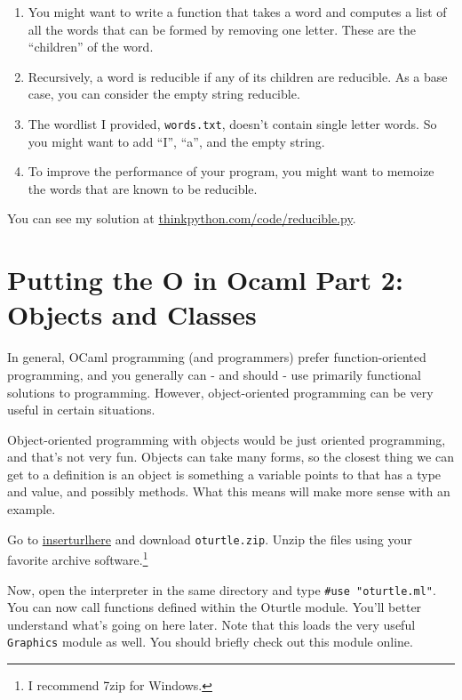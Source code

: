 \documentclass[10pt]{book}
\begin{document}
{\begin{ex}
\begin{enumerate}

\item You might want to write a function that takes a word and
  computes a list of all the words that can be formed by removing one
  letter.  These are the ``children'' of the word.


\item Recursively, a word is reducible if any of its children
are reducible.  As a base case, you can consider the empty
string reducible.

\item The wordlist I provided, {\tt words.txt}, doesn't
contain single letter words.  So you might want to add
``I'', ``a'', and the empty string.

\item To improve the performance of your program, you might want
to memoize the words that are known to be reducible.

\end{enumerate}

You can see my solution at \url{thinkpython.com/code/reducible.py}.

\end{ex}


\chapter{Putting the O in Ocaml Part 2: Objects and Classes}

In general, OCaml programming (and programmers) prefer function-oriented programming, and you generally can - and should - use primarily functional solutions to programming. However, object-oriented programming can be very useful in certain situations.

Object-oriented programming with objects would be just oriented programming, and that's not very fun. Objects can take many forms, so the closest thing we can get to a definition is an object is something a variable points to that has a type and value, and possibly methods. What this means will make more sense with an example.

Go to \url{inserturlhere} and download {\tt oturtle.zip}. Unzip the files using your favorite archive software.\footnote{I recommend 7zip for Windows.}

Now, open the interpreter in the same directory and type {\tt #use "oturtle.ml"}. You can now call functions defined within the Oturtle module. You'll better understand  what's going on here later. Note that this loads the very useful {\tt Graphics} module as well. You should briefly check out this module online.

}
\end{document}
